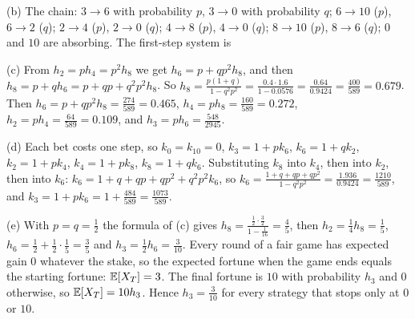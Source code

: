 \begin{enumerate}[resume*=quiz]
\begin{solution}
(b) The chain: $3\to6$ with probability $p$, $3\to0$ with probability $q$; $6\to10$ ($p$), $6\to2$ ($q$); $2\to4$ ($p$), $2\to0$ ($q$); $4\to8$ ($p$), $4\to0$ ($q$); $8\to10$ ($p$), $8\to6$ ($q$); $0$ and $10$ are absorbing. The first-step system is

(c) From $h_2=ph_4=p^2h_8$ we get $h_6=p+qp^2h_8$, and then $h_8=p+qh_6=p+qp+q^2p^2h_8$. So
$h_8=\frac{p(1+q)}{1-q^2p^2}=\frac{0.4\cdot1.6}{1-0.0576}=\frac{0.64}{0.9424}=\frac{400}{589}=0.679$.
Then $h_6=p+qp^2h_8=\frac{274}{589}=0.465$, $h_4=ph_8=\frac{160}{589}=0.272$, $h_2=ph_4=\frac{64}{589}=0.109$, and $h_3=ph_6=\frac{548}{2945}$.

(d) Each bet costs one step, so
$k_0=k_{10}=0$, $k_3=1+pk_6$, $k_6=1+qk_2$, $k_2=1+pk_4$, $k_4=1+pk_8$, $k_8=1+qk_6$.
Substituting $k_8$ into $k_4$, then into $k_2$, then into $k_6$: $k_6=1+q+qp+qp^2+q^2p^2k_6$, so $k_6=\frac{1+q+qp+qp^2}{1-q^2p^2}=\frac{1.936}{0.9424}=\frac{1210}{589}$, and $k_3=1+pk_6=1+\frac{484}{589}=\frac{1073}{589}$.

(e) With $p=q=\tfrac12$ the formula of (c) gives $h_8=\frac{\frac12\cdot\frac32}{1-\frac1{16}}=\frac45$, then $h_2=\tfrac14h_8=\tfrac15$, $h_6=\tfrac12+\tfrac12\cdot\tfrac15=\tfrac35$ and $h_3=\tfrac12h_6=\tfrac3{10}$.
Every round of a fair game has expected gain $0$ whatever the stake, so the expected fortune when the game ends equals the starting fortune: $\mathbb{E}[X_T]=3$. The final fortune is $10$ with probability $h_3$ and $0$ otherwise, so $\mathbb{E}[X_T]=10h_3$. Hence $h_3=\tfrac3{10}$ for every strategy that stops only at $0$ or $10$.
\end{solution}


\end{enumerate}
